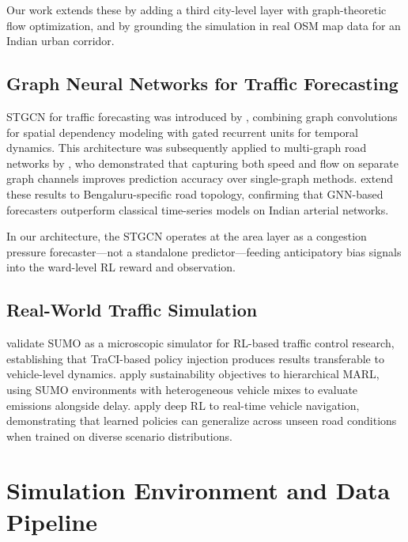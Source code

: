 \documentclass[conference]{IEEEtran}
\begin{document}
Our work extends these by adding a third city-level layer with graph-theoretic
flow optimization, and by grounding the simulation in real OSM map data for
an Indian urban corridor.

\subsection{Graph Neural Networks for Traffic Forecasting}

STGCN for traffic forecasting was introduced by \citeauthor{stgcn_ieee} \cite{stgcn_ieee},
combining graph convolutions for spatial dependency modeling with
gated recurrent units for temporal dynamics. This architecture was
subsequently applied to multi-graph road networks by \citeauthor{ddpgcn2021}
\cite{ddpgcn2021}, who demonstrated that capturing both speed and flow
on separate graph channels improves prediction accuracy over single-graph
methods. \citeauthor{gnn_traffic_bs} \cite{gnn_traffic_bs} extend these results
to Bengaluru-specific road topology, confirming that GNN-based forecasters
outperform classical time-series models on Indian arterial networks.

In our architecture, the STGCN operates at the area layer as a congestion
pressure forecaster---not a standalone predictor---feeding anticipatory
bias signals into the ward-level RL reward and observation.

\subsection{Real-World Traffic Simulation}

\citeauthor{aitraffic_sumo} \cite{aitraffic_sumo} validate SUMO as a
microscopic simulator for RL-based traffic control research, establishing
that TraCI-based policy injection produces results transferable to
vehicle-level dynamics. \citeauthor{sustainability_marl} \cite{sustainability_marl}
apply sustainability objectives to hierarchical MARL, using SUMO environments
with heterogeneous vehicle mixes to evaluate emissions alongside delay.
\citeauthor{deeprl_navigation} \cite{deeprl_navigation} apply deep RL
to real-time vehicle navigation, demonstrating that learned policies
can generalize across unseen road conditions when trained on diverse
scenario distributions.

\section{Simulation Environment and Data Pipeline}
\label{sec:system}
\end{document}
